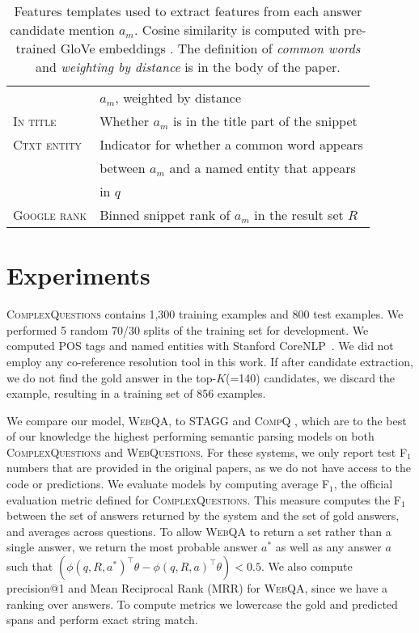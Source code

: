 \documentclass[11pt,a4paper]{article}
\begin{document}
\begin{table}[t]
\begin{center}
{\begin{tabular}{l|l}
& $a_m$,  weighted by distance \\
\textsc{In title} & Whether $a_m$ is in the title part of the snippet  \\ 
\textsc{Ctxt entity} & Indicator for whether a common word appears \\
& between $a_m$ and a named entity that appears\\
&in $q$\\ 
\textsc{Google rank} & Binned snippet rank of $a_m$ in the result set $R$ \\
\toprule
\end{tabular}}
\end{center}
\caption{Features templates used to extract features from each answer candidate mention $a_m$. Cosine similarity is computed with pre-trained GloVe embeddings \cite{pennington2014glove}. The definition of \emph{common words} and \emph{weighting by distance} is in the body of the paper.}
\label{tab:features}
\end{table}


 \section{Experiments}
\label{sec:experiments}

\textsc{ComplexQuestions} contains 1,300 training examples and 800 test examples. We performed 5 random 70/30 splits of the training set for development. We computed POS tags and named entities with Stanford CoreNLP~\cite{manning2014stanford}. We did not employ any co-reference resolution tool in this work. If after candidate extraction, we do not find the gold answer in the top-$K$(=140) candidates, we discard the example, resulting in a training set of 856 examples. 

We compare our model, \textsc{WebQA}, to \textsc{STAGG} \cite{yih2015stagg} and \textsc{CompQ} \cite{bao2016constraint}, which are to the best of our knowledge the highest performing semantic parsing models on both \textsc{ComplexQuestions} and \textsc{WebQuestions}. For these systems, we only report test F$_1$ numbers that are provided in the original papers, as we do not have access to the code or predictions.
We evaluate models by computing average F$_1$, the official evaluation metric defined for \textsc{ComplexQuestions}. This measure computes the F$_1$ between the set of answers returned by the system and the set of gold answers, and averages across questions. To allow \textsc{WebQA} to return a set rather than a single answer, we return the most probable answer $a^*$ as well as any answer $a$ such that $(\phi(q, R, a^*)^\top \theta - \phi(q, R, a)^\top \theta) < 0.5$.
We also compute precision@1 and Mean Reciprocal Rank (MRR) for \textsc{WebQA}, since we have a ranking  over answers.
To compute metrics we lowercase the gold and predicted spans and perform exact string match.
\end{document}
